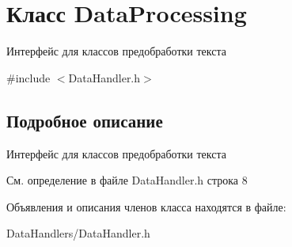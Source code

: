 \hypertarget{class_data_processing}{}\section{Класс Data\+Processing}
\label{class_data_processing}


Интерфейс для классов предобработки текста  




{\ttfamily \#include $<$Data\+Handler.\+h$>$}



\subsection{Подробное описание}
Интерфейс для классов предобработки текста 

См. определение в файле Data\+Handler.\+h строка 8



Объявления и описания членов класса находятся в файле\+:\begin{DoxyCompactItemize}
\item 
Data\+Handlers/Data\+Handler.\+h\end{DoxyCompactItemize}
